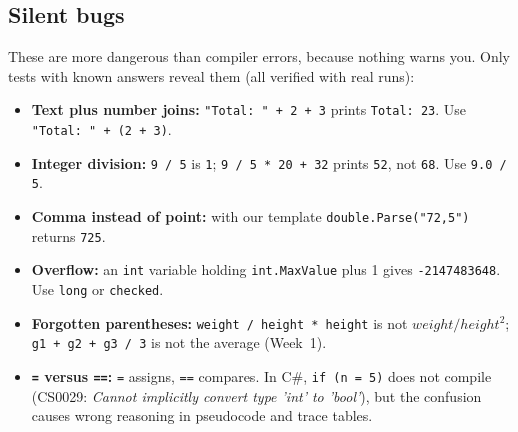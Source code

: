\subsection{Silent bugs}
\begin{warnbox}
These are more dangerous than compiler errors, because nothing warns you. Only tests with known answers reveal them (all verified with real runs):
\begin{itemize}[leftmargin=*,itemsep=1pt]
  \item \textbf{Text plus number joins:} \texttt{"Total: " + 2 + 3} prints \texttt{Total: 23}. Use \texttt{"Total: " + (2 + 3)}.
  \item \textbf{Integer division:} \texttt{9 / 5} is \texttt{1}; \texttt{9 / 5 * 20 + 32} prints \texttt{52}, not \texttt{68}. Use \texttt{9.0 / 5}.
  \item \textbf{Comma instead of point:} with our template \texttt{double.Parse("72,5")} returns \texttt{725}.
  \item \textbf{Overflow:} an \texttt{int} variable holding \texttt{int.MaxValue} plus 1 gives \texttt{-2147483648}. Use \texttt{long} or \texttt{checked}.
  \item \textbf{Forgotten parentheses:} \texttt{weight / height * height} is not $weight/height^2$; \texttt{g1 + g2 + g3 / 3} is not the average (Week~1).
  \item \textbf{\texttt{=} versus \texttt{==}:} \texttt{=} assigns, \texttt{==} compares. In C\#, \texttt{if (n = 5)} does not compile (CS0029: \emph{Cannot implicitly convert type 'int' to 'bool'}), but the confusion causes wrong reasoning in pseudocode and trace tables.
\end{itemize}
\end{warnbox}

